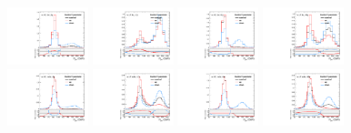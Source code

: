 \begin{figure}[htbp]
  \centering
  \includegraphics[width=0.21\textwidth]{fig/uncertainties/systs_res_e_HP_bb_LDy_fractionY_ProjY.pdf}
  \includegraphics[width=0.21\textwidth]{fig/uncertainties/systs_res_e_LP_bb_LDy_fractionY_ProjY.pdf}
  \includegraphics[width=0.21\textwidth]{fig/uncertainties/systs_res_e_HP_bb_HDy_fractionY_ProjY.pdf}
  \includegraphics[width=0.21\textwidth]{fig/uncertainties/systs_res_e_LP_bb_HDy_fractionY_ProjY.pdf}\\
  \includegraphics[width=0.21\textwidth]{fig/uncertainties/systs_res_e_HP_nobb_LDy_fractionY_ProjY.pdf}
  \includegraphics[width=0.21\textwidth]{fig/uncertainties/systs_res_e_LP_nobb_LDy_fractionY_ProjY.pdf}
  \includegraphics[width=0.21\textwidth]{fig/uncertainties/systs_res_e_HP_nobb_HDy_fractionY_ProjY.pdf}
  \includegraphics[width=0.21\textwidth]{fig/uncertainties/systs_res_e_LP_nobb_HDy_fractionY_ProjY.pdf}\\

\end{figure}
